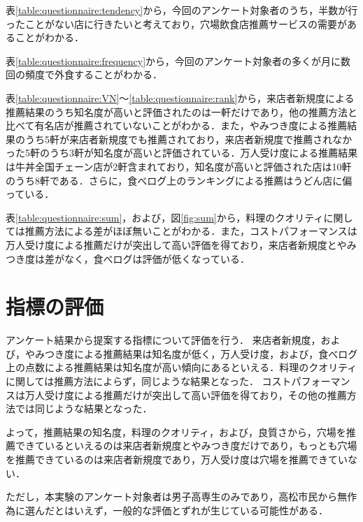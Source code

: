 	\par
	表\ref{table:questionnaire:tendency}から，今回のアンケート対象者のうち，半数が行ったことがない店に行きたいと考えており，穴場飲食店推薦サービスの需要があることがわかる．\par
	表\ref{table:questionnaire:frequency}から，今回のアンケート対象者の多くが月に数回の頻度で外食することがわかる．\par
	表\ref{table:questionnaire:VN}〜\ref{table:questionnaire:rank}から，来店者新規度による推薦結果のうち知名度が高いと評価されたのは一軒だけであり，他の推薦方法と比べて有名店が推薦されていないことがわかる．また，やみつき度による推薦結果のうち5軒が来店者新規度でも推薦されており，来店者新規度で推薦されなかった5軒のうち3軒が知名度が高いと評価されている．万人受け度による推薦結果は牛丼全国チェーン店が2軒含まれており，知名度が高いと評価された店は10軒のうち8軒である．さらに，食べログ上のランキングによる推薦はうどん店に偏っている．\par
	表\ref{table:questionnaire:sum}，および，図\ref{fig:sum}から，料理のクオリティに関しては推薦方法による差がほぼ無いことがわかる．また，コストパフォーマンスは万人受け度による推薦だけが突出して高い評価を得ており，来店者新規度とやみつき度は差がなく，食べログは評価が低くなっている．

\section{指標の評価}
アンケート結果から提案する指標について評価を行う．
来店者新規度，および，やみつき度による推薦結果は知名度が低く，万人受け度，および，食べログ上の点数による推薦結果は知名度が高い傾向にあるといえる．料理のクオリティに関しては推薦方法によらず，同じような結果となった．
コストパフォーマンスは万人受け度による推薦だけが突出して高い評価を得ており，その他の推薦方法では同じような結果となった．%
\par
よって，推薦結果の知名度，料理のクオリティ，および，良質さから，穴場を推薦できているといえるのは来店者新規度とやみつき度だけであり，もっとも穴場を推薦できているのは来店者新規度であり，万人受け度は穴場を推薦できていない．
\par
ただし，本実験のアンケート対象者は男子高専生のみであり，高松市民から無作為に選んだとはいえず，一般的な評価とずれが生じている可能性がある．
